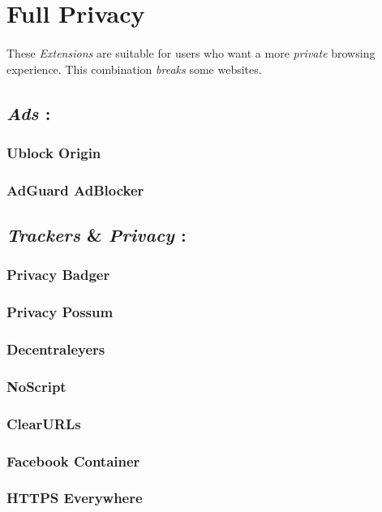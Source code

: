 \documentclass[12pt, a4paper]{article}
\begin{document}
\newpage
\section{Full Privacy}
\paragraph{}
These \emph{Extensions} are suitable for users who want a more \emph{private} browsing experience. This combination \emph{breaks} some websites.

\subsection*{\emph{Ads} :}
\subsubsection*{Ublock Origin}
\subsubsection*{AdGuard AdBlocker\\}

\subsection*{\emph{Trackers} \& \emph{Privacy} :}
\subsubsection*{Privacy Badger}
\subsubsection*{Privacy Possum}
\subsubsection*{Decentraleyers}
\subsubsection*{NoScript}
\subsubsection*{ClearURLs}
\subsubsection*{Facebook Container}
\subsubsection*{HTTPS Everywhere\\}
\end{document}
